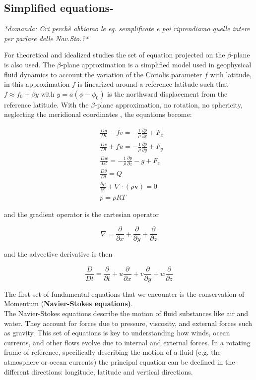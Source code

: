 \subsection{Simplified equations-}\label{summary-of-fundamental-equations}

\textit{*domanda: Cri perchè abbiamo le eq. semplificate e poi riprendiamo quelle intere per parlare delle Nav.Sto.?*}

For theoretical and idealized studies the set of equation projected on the \(\beta\)-plane is also used. The $\beta$-plane approximation is a simplified model used in geophysical fluid dynamics to account the variation of the Coriolis parameter $f$ with latitude, in this approximation $f$ is linearized around a reference latitude such that $f\approx f_0+\beta y$ with $y=a(\phi-\phi_0)$ is the northward displacement from the reference latitude. With the $\beta$-plane approximation, no rotation, no sphericity, neglecting the meridional coordinates , the equations become:

\[\begin{aligned}
      &\frac{D u}{Dt} - fv  = -\frac{1}{\rho}\frac{\partial p}{\partial x}   + F_x \\
      &\frac{D v}{Dt} + fu = -\frac{1}{\rho}\frac{\partial p}{\partial y}  + F_y \\
      &\frac{D w}{Dt}  = -\frac{1}{\rho }\frac{\partial p}{\partial z} -g  + F_z \\
      &\frac{D \theta}{Dt} = Q\\
      &\frac{\partial \rho}{\partial t}+\nabla\cdot(\rho\mathbf{v}) = 0\\
      &p = \rho R T
\end{aligned}\]

and the gradient operator is the cartesian operator

\[\nabla = \frac{\partial }{\partial x} + \frac{\partial }{\partial y} + \frac{\partial }{\partial z}\]

and the advective derivative is then

\[\frac{D }{Dt} = \frac{\partial }{\partial t} + u\frac{\partial }{\partial x} + v\frac{\partial }{\partial y} + w\frac{\partial }{\partial z}\]

The first set of fundamental equations that we encounter is the conservation of Momentum (\textbf{Navier-Stokes equations)}.\\
The Navier-Stokes equations describe the motion of fluid substances like air and water. They account for forces due to pressure, viscosity, and external forces such as gravity. This set of equations is key to understanding how winds, ocean currents, and other flows evolve due to internal and external forces. In a rotating frame of reference, specifically describing the motion of a fluid (e.g. the atmosphere or ocean currents) the principal equation can be declined in the different directions: longitude, latitude and vertical directions.

